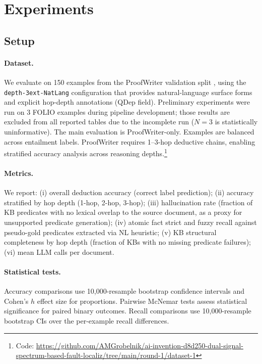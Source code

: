 \documentclass[11pt,letterpaper]{article}
\begin{document}
\section{Experiments}

\subsection{Setup}

\paragraph{Dataset.} We evaluate on 150 examples from the ProofWriter validation split \citep{Clark2020,Tafjord2021}, using the \texttt{depth-3ext-NatLang} configuration that provides natural-language surface forms and explicit hop-depth annotations (QDep field). Preliminary experiments were run on 3 FOLIO \citep{Han2022} examples during pipeline development; those results are excluded from all reported tables due to the incomplete run ($N=3$ is statistically uninformative). The main evaluation is ProofWriter-only. Examples are balanced across entailment labels. ProofWriter requires 1--3-hop deductive chains, enabling stratified accuracy analysis across reasoning depths.\footnote{Code: \url{https://github.com/AMGrobelnik/ai-invention-d8d250-dual-signal-spectrum-based-fault-localiz/tree/main/round-1/dataset-1}}

\paragraph{Metrics.} We report: (i) overall deduction accuracy (correct label prediction); (ii) accuracy stratified by hop depth (1-hop, 2-hop, 3-hop); (iii) hallucination rate (fraction of KB predicates with no lexical overlap to the source document, as a proxy for unsupported predicate generation); (iv) atomic fact strict and fuzzy recall against pseudo-gold predicates extracted via NL heuristic; (v) KB structural completeness by hop depth (fraction of KBs with no missing predicate failures); (vi) mean LLM calls per document.

\paragraph{Statistical tests.} Accuracy comparisons use 10,000-resample bootstrap confidence intervals and Cohen's $h$ effect size for proportions. Pairwise McNemar tests assess statistical significance for paired binary outcomes. Recall comparisons use 10,000-resample bootstrap CIs over the per-example recall differences.
\end{document}
